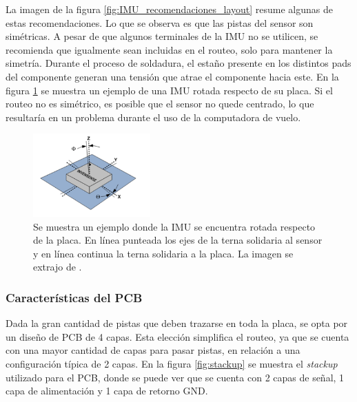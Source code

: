 La imagen de la figura \ref{fig:IMU_recomendaciones_layout} resume algunas de estas recomendaciones. Lo que se observa es que las pistas del sensor son simétricas. A pesar de que algunos terminales de la IMU no se utilicen, se recomienda que igualmente sean incluidas en el routeo, solo para mantener la simetría. Durante el proceso de soldadura, el estaño presente en los distintos pads del componente generan una tensión que atrae el componente hacia este. En la figura \ref{fig:IMU_missalignment} se muestra un ejemplo de una IMU rotada respecto de su placa. Si el routeo no es simétrico, es posible que el sensor no quede centrado, lo que resultaría en un problema durante el uso de la computadora de vuelo.

\begin{figure}[H]
    \centering
    \includegraphics[width=0.4\textwidth]{img/IMU_missalignment.png}
    \caption{Se muestra un ejemplo donde la IMU se encuentra rotada respecto de la placa. En línea punteada los ejes de la terna solidaria al sensor y en línea continua la terna solidaria a la placa. La imagen se extrajo de \cite{IMUpcb_4}.}
    \label{fig:IMU_missalignment}
\end{figure}


\subsubsection{Características del PCB}

Dada la gran cantidad de pistas que deben trazarse en toda la placa, se opta por un diseño de PCB de 4 capas. Esta elección simplifica el routeo, ya que se cuenta con una mayor cantidad de capas para pasar pistas, en relación a una configuración típica de 2 capas. En la figura \ref{fig:stackup} se muestra el \textit{stackup} utilizado para el PCB, donde se puede ver que se cuenta con 2 capas de señal, 1 capa de alimentación y 1 capa de retorno GND.

